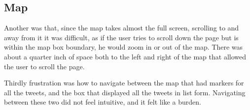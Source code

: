 \documentclass[11pt]{article}
\begin{document}
\subsection{Map}
Another was that, since the map takes almost the full screen, scrolling to and away from it it was difficult, as if the user tries to scroll down the page but is within the map box boundary, he would zoom in or out of the map. There was about a quarter inch of space both to the left and right of the map that allowed the user to scroll the page. 



Thirdly frustration was how to navigate between the map that had markers for all the tweets, and the box that displayed all the tweets in list form. Navigating between these two did not feel intuitive, and it felt like a burden.







\end{document}

